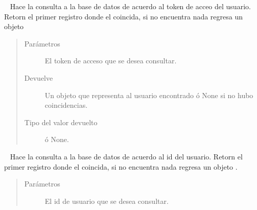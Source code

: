 \begin{fulllineitems}
\begin{quote}
\begin{description}
\begin{itemize}
\end{itemize}

\end{description}\end{quote}

\begin{fulllineitems}
\label{\detokenize{chapter_two/desc_cloudnao:app.models.user_model.UserModel.find_by_access_token}}~
Hace la consulta a la base de datos de acuerdo al token
de acceo del usuario.
Retorn el primer registro donde el  coincida,
si no encuentra nada regresa un objeto 
\begin{quote}\begin{description}
\item[{Parámetros}] \leavevmode
{} \textendash{} El token de acceso que se desea consultar.

\item[{Devuelve}] \leavevmode
Un objeto  que representa al usuario encontrado ó None si no hubo coincidencias.

\item[{Tipo del valor devuelto}] \leavevmode
{} ó None.

\end{description}\end{quote}

\end{fulllineitems}


\begin{fulllineitems}
\label{\detokenize{chapter_two/desc_cloudnao:app.models.user_model.UserModel.find_by_id}}~
Hace la consulta a la base de datos de acuerdo al id del usuario.
Retorn el primer registro donde el  coincida, si no encuentra
nada regresa un objeto .
\begin{quote}\begin{description}
\item[{Parámetros}] \leavevmode
{} \textendash{} El id de usuario que se desea consultar.


\end{description}
\end{quote}
\end{fulllineitems}
\end{fulllineitems}
